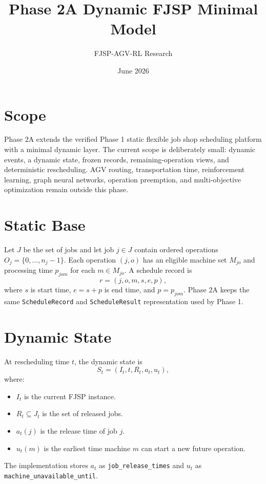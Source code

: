 \documentclass[11pt]{article}
\title{Phase 2A Dynamic FJSP Minimal Model}
\author{FJSP-AGV-RL Research}
\date{June 2026}
\begin{document}
\maketitle

\section{Scope}

Phase 2A extends the verified Phase 1 static flexible job shop scheduling
platform with a minimal dynamic layer. The current scope is deliberately small:
dynamic events, a dynamic state, frozen records, remaining-operation views, and
deterministic rescheduling. AGV routing, transportation time, reinforcement
learning, graph neural networks, operation preemption, and multi-objective
optimization remain outside this phase.

\section{Static Base}

Let $J$ be the set of jobs and let job $j \in J$ contain ordered operations
$O_j = \{0,\ldots,n_j-1\}$. Each operation $(j,o)$ has an eligible machine set
$M_{jo}$ and processing time $p_{jom}$ for each $m \in M_{jo}$. A schedule record
is
\[
  r = (j,o,m,s,e,p),
\]
where $s$ is start time, $e=s+p$ is end time, and $p=p_{jom}$. Phase 2A keeps the
same \texttt{ScheduleRecord} and \texttt{ScheduleResult} representation used by
Phase 1.

\section{Dynamic State}

At rescheduling time $t$, the dynamic state is
\[
  S_t = (I_t, t, R_t, a_t, u_t),
\]
where:

\begin{itemize}
  \item $I_t$ is the current FJSP instance.
  \item $R_t \subseteq J_t$ is the set of released jobs.
  \item $a_t(j)$ is the release time of job $j$.
  \item $u_t(m)$ is the earliest time machine $m$ can start a new future
        operation.
\end{itemize}

The implementation stores $a_t$ as \texttt{job\_release\_times} and $u_t$ as
\texttt{machine\_unavailable\_until}.
\end{document}
